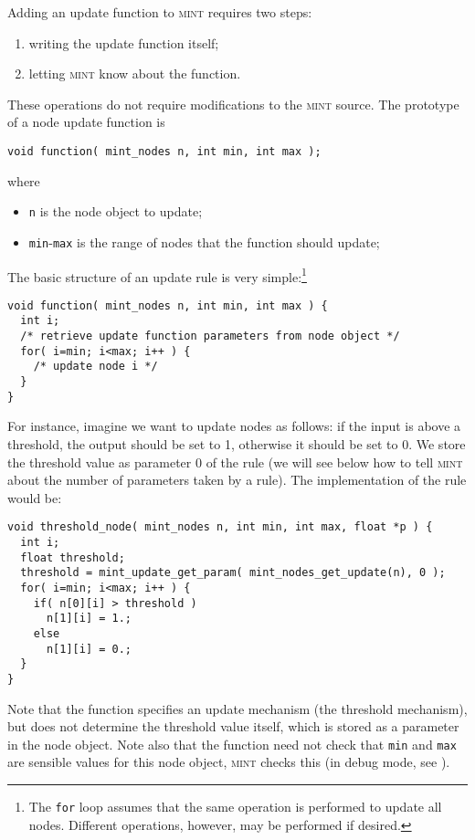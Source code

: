\documentclass[12pt,letterpaper]{memoir}
\let\fref\relax%
\newcommand{\mint}{{\scshape\sffamily mint}\xspace}
\begin{document}
Adding an update function to \mint requires two steps:
\begin{enumerate}
\item writing the update function itself;
\item letting \mint know about the function.
\end{enumerate}
These operations do not require modifications to the \mint source.
The prototype of a node update function is
\begin{lstlisting}
void function( mint_nodes n, int min, int max );
\end{lstlisting}
where
\begin{itemize}
\item \lstinline{n} is the node object to update;
\item \lstinline{min}-\lstinline{max} is the range of nodes that the
  function should update;
\end{itemize}
The basic structure of an  update rule is very simple:\footnote{The
  \lstinline{for} loop assumes that the same operation is performed to
update all nodes. Different operations, however, may be performed if
desired.}
\begin{lstlisting}
void function( mint_nodes n, int min, int max ) {
  int i;
  /* retrieve update function parameters from node object */
  for( i=min; i<max; i++ ) {
    /* update node i */
  }
}  
\end{lstlisting}
For instance, imagine we want to update nodes as follows: if the input
is above a threshold, the output should be set to 1, otherwise it
should be set to 0. We store the threshold value as parameter 0 of the
rule (we will see below how to tell \mint about the number of
parameters taken by a rule). The implementation of the rule would be:
\begin{lstlisting}
void threshold_node( mint_nodes n, int min, int max, float *p ) {
  int i;
  float threshold;
  threshold = mint_update_get_param( mint_nodes_get_update(n), 0 );
  for( i=min; i<max; i++ ) {
    if( n[0][i] > threshold )
      n[1][i] = 1.;
    else
      n[1][i] = 0.;
  }
}  
\end{lstlisting}
Note that the function specifies an update mechanism (the threshold
mechanism), but does not determine the threshold value itself, which
is stored as a parameter in the node object.  Note also that the
function need not check that \lstinline{min} and \lstinline{max} are
sensible values for this node object, \mint checks this (in debug
mode, see \fref{sec:debugging}).
\end{document}
